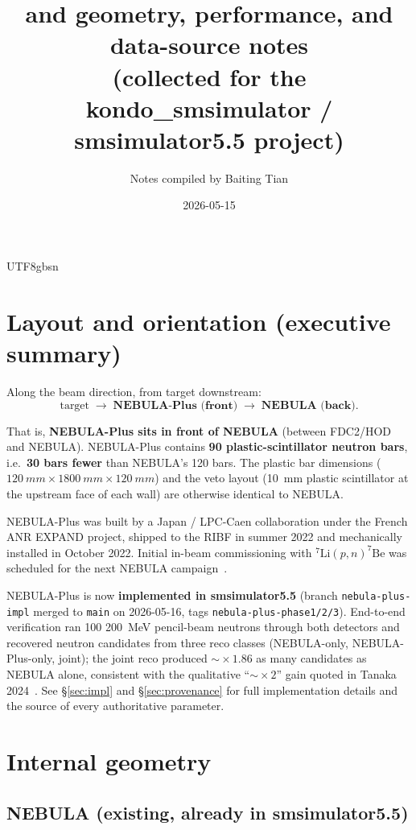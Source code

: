 \documentclass[11pt,a4paper]{article}
\title{\NEB{} and \NPL{} geometry, performance, and data-source notes\\
       \large (collected for the kondo\_smsimulator / smsimulator5.5 project)}
\author{Notes compiled by Baiting Tian}
\date{2026-05-15}
\newcommand{\NEB}{NEBULA}
\newcommand{\NPL}{NEBULA-Plus}
\begin{document}
\begin{CJK}{UTF8}{gbsn}
\maketitle

\section{Layout and orientation (executive summary)}

Along the beam direction, from target downstream:
\[
\text{target}  \;\longrightarrow\;
\textbf{\NPL{} (front)} \;\longrightarrow\; \textbf{\NEB{} (back)}.
\]

That is, \textbf{\NPL{} sits in front of \NEB{}} (between FDC2/HOD and \NEB{}).
\NPL{} contains \textbf{90 plastic-scintillator neutron bars}, i.e.\
\textbf{30 bars fewer} than \NEB{}'s 120 bars. The plastic bar dimensions
($\SI{120}{mm}\times\SI{1800}{mm}\times\SI{120}{mm}$) and the veto layout (\SI{10}{mm} plastic
scintillator at the upstream face of each wall) are otherwise identical to \NEB{}.

\NPL{} was built by a Japan / LPC-Caen collaboration under the French ANR EXPAND project,
shipped to the RIBF in summer 2022 and mechanically installed in October 2022.
Initial in-beam commissioning with $^{7}\mathrm{Li}(p,n)^{7}\mathrm{Be}$ was scheduled
for the next \NEB{} campaign~\cite{aprApr2022}.

\NPL{} is now \textbf{implemented in smsimulator5.5} (branch
\texttt{nebula-plus-impl} merged to \texttt{main} on 2026-05-16, tags
\texttt{nebula-plus-phase1/2/3}). End-to-end verification ran 100
\SI{200}{MeV} pencil-beam neutrons through both detectors and recovered
neutron candidates from three reco classes (\NEB{}-only, \NPL{}-only,
joint); the joint reco produced $\sim\!\!\times 1.86$ as many candidates
as \NEB{} alone, consistent with the qualitative ``$\sim\!\!\times 2$''
gain quoted in Tanaka 2024~\cite{tanaka2024}. See \S\ref{sec:impl} and
\S\ref{sec:provenance} for full implementation details and the source of
every authoritative parameter.

\section{Internal geometry}

\subsection{\NEB{} (existing, already in smsimulator5.5)}


\end{CJK}
\end{document}
